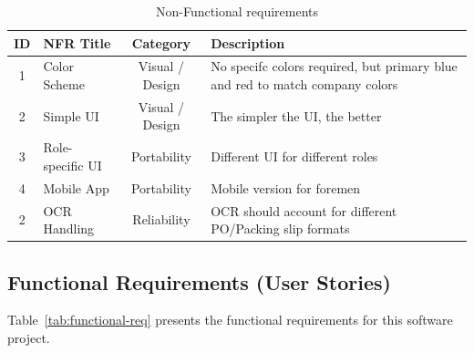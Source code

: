 \documentclass{article}
\begin{document}
\begin{table}[h!]
\centering
\begin{tabular}{c l c p{9cm}}
\hline
\textbf{ID} & \textbf{NFR Title} & \textbf{Category} & \textbf{Description} \\
\hline
1 & Color Scheme & Visual / Design & No specifc colors required, but primary blue and red to match company colors \\ \hline
2 & Simple UI  & Visual / Design & The simpler the UI, the better \\ \hline
3 & Role-specific UI  & Portability & Different UI for different roles \\ \hline
4 & Mobile App  & Portability & Mobile version for foremen \\ \hline
2 & OCR Handling  & Reliability & OCR should account for different PO/Packing slip formats \\ \hline
\end{tabular}
\caption{Non-Functional requirements}\label{tab:nfr}
\end{table}


\subsection{Functional Requirements (User Stories)}

Table~\ref{tab:functional-req} presents the functional requirements for this software project.
\end{document}
